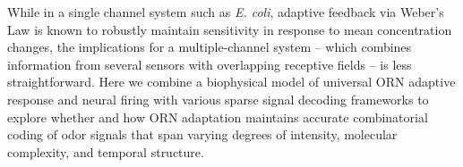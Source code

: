 While in a single channel system such as \textit{E. coli}, adaptive feedback via Weber's Law is known to robustly maintain sensitivity in response to mean concentration changes, the implications for a multiple-channel system -- which combines information from several sensors with overlapping receptive fields  -- is less straightforward. Here we combine a biophysical model of universal ORN adaptive response and neural firing with various sparse signal decoding frameworks to explore whether and how ORN adaptation maintains accurate combinatorial coding of odor signals that span varying degrees of intensity, molecular complexity, and temporal structure. 

